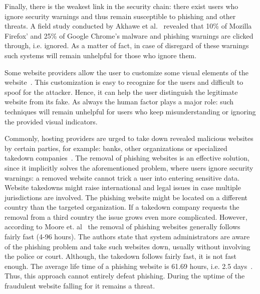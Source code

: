 \begin{description}[leftmargin=0cm]
  Finally, there is the weakest link in the security chain: there exist users who ignore security warnings and thus remain susceptible to phishing and other threats.
A field study conducted by Akhawe et al.~\cite{akhawe2013alice} revealed that 10\% of Mozilla Firefox' and 25\% of Google Chrome's malware and phishing warnings are clicked through, i.e. ignored.
 As a matter of fact, in case of disregard of these warnings such systems will remain unhelpful for those who ignore them. 
	\item[Visual Distinction:] Some website providers allow the user to customize some visual elements of the website~\cite{dhamija2005battle}.
This customization is easy to recognize for the users and difficult to spoof for the attacker.
Hence, it can help the user distinguish the legitimate website from its fake.
As always the human factor plays a major role: such techniques will remain unhelpful for users who keep misunderstanding or ignoring the provided visual indicators. 

	\item[Takedown:] Commonly, hosting providers are urged to take down revealed malicious websites by certain parties, for example: banks, other organizations or specialized takedown companies~\cite{moore2007examining}. The removal of phishing websites is an effective solution, since it implicitly solves the aforementioned problem, where users ignore security warnings: a removed website cannot trick a user into entering sensitive data.
Website takedowns might raise international and legal issues in case multiple jurisdictions are involved.
The phishing website might be located on a different country than the targeted organization.
If a takedown company requests the removal from a third country the issue grows even more complicated.
However, according to Moore et. al~\cite{mooretakedown} the removal of phishing websites generally follows fairly fast (4-96 hours).
The authors state that system administrators are aware of the phishing problem and take such websites down, usually without involving the police or court.
Although, the takedown follows fairly fast, it is not fast enough.
The average life time of a phishing website is 61.69 hours, i.e. 2.5 days~\cite{moore2007examining}.
Thus, this approach cannot entirely defeat phishing. During the uptime of the fraudulent website falling for it remains a threat.
\end{description}

